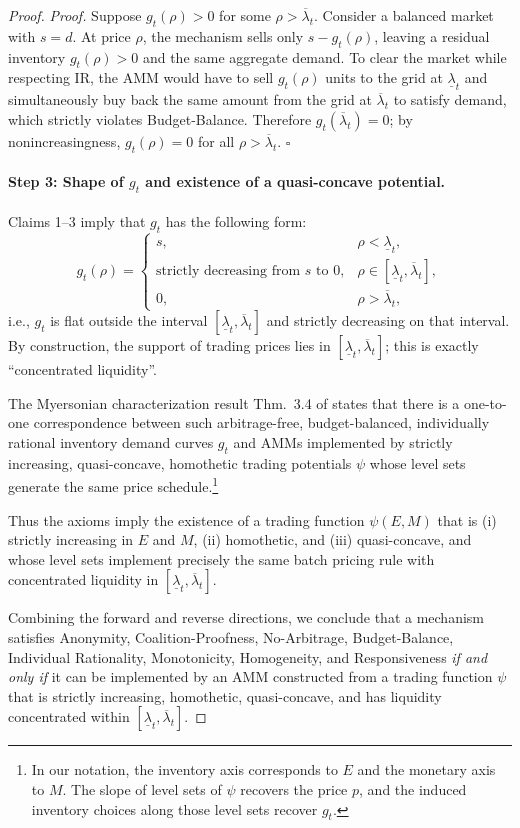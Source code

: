 \documentclass[12pt, notitlepage]{article}
\begin{document}
\begin{proof}
\emph{Proof.}
Suppose \(g_t(\rho)>0\) for some \(\rho>\overline{\lambda}_t\). Consider a balanced market with \(s=d\). At price \(\rho\), the mechanism sells only \(s-g_t(\rho)\), leaving a residual inventory \(g_t(\rho)>0\) and the same aggregate demand. To clear the market while respecting IR, the AMM would have to sell \(g_t(\rho)\) units to the grid at \(\underline{\lambda}_t\) and simultaneously buy back the same amount from the grid at \(\overline{\lambda}_t\) to satisfy demand, which strictly violates Budget-Balance. Therefore \(g_t(\overline{\lambda}_t)=0\); by nonincreasingness, \(g_t(\rho)=0\) for all \(\rho>\overline{\lambda}_t\). \(\square\)

\paragraph{Step 3: Shape of \(g_t\) and existence of a quasi-concave potential.}
Claims 1–3 imply that \(g_t\) has the following form:
\[
g_t(\rho)=
\begin{cases}
s, & \rho<\underline{\lambda}_t,\\[4pt]
\text{strictly decreasing from }s\text{ to }0, & \rho\in[\underline{\lambda}_t,\overline{\lambda}_t],\\[4pt]
0, & \rho>\overline{\lambda}_t,
\end{cases}
\]
i.e., \(g_t\) is flat outside the interval \([\underline{\lambda}_t,\overline{\lambda}_t]\) and strictly decreasing on that interval. By construction, the support of trading prices lies in \([\underline{\lambda}_t,\overline{\lambda}_t]\); this is exactly ``concentrated liquidity''.

The Myersonian characterization result Thm.~3.4 of  \cite{milionis2023myersonian} states that there is a one-to-one correspondence between such arbitrage-free, budget-balanced, individually rational inventory demand curves \(g_t\) and AMMs implemented by strictly increasing, quasi-concave, homothetic trading potentials \(\psi\) whose level sets generate the same price schedule.\footnote{In our notation, the inventory axis corresponds to \(E\) and the monetary axis to \(M\). The slope of level sets of \(\psi\) recovers the price \(p\), and the induced inventory choices along those level sets recover \(g_t\).}

Thus the axioms imply the existence of a trading function \(\psi(E,M)\) that is (i) strictly increasing in \(E\) and \(M\), (ii) homothetic, and (iii) quasi-concave, and whose level sets implement precisely the same batch pricing rule with concentrated liquidity in \([\underline{\lambda}_t,\overline{\lambda}_t]\).

\medskip
Combining the forward and reverse directions, we conclude that a mechanism satisfies Anonymity, Coalition-Proofness, No-Arbitrage, Budget-Balance, Individual Rationality, Monotonicity, Homogeneity, and Responsiveness \emph{if and only if} it can be implemented by an AMM constructed from a trading function \(\psi\) that is strictly increasing, homothetic, quasi-concave, and has liquidity concentrated within \([\underline{\lambda}_t,\overline{\lambda}_t]\).
\qedhere

\end{proof}
\end{document}
